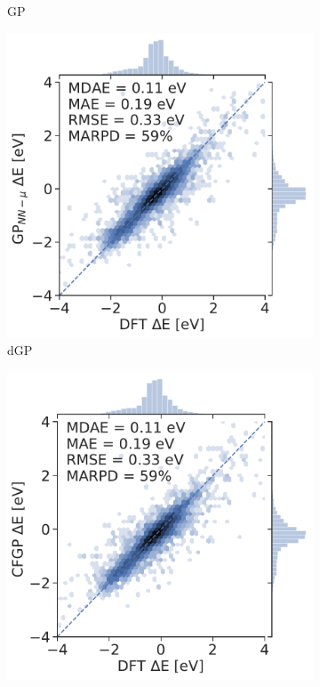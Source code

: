 \documentclass[]{achemso}
\begin{document}
\begin{figure}
\begin{subfigure}{0.32\textwidth}
        \caption{\gls{GP}}\label{fig:parity_gp}
    \end{subfigure}
    \begin{subfigure}{0.32\textwidth}
        \includegraphics[width=\textwidth]{../GPnnm/Matern/parity.pdf}
        \caption{\gls{dGP}}\label{fig:parity_dgp}
    \end{subfigure}
    \begin{subfigure}{0.32\textwidth}
        \includegraphics[width=\textwidth]{../CFGP/Matern/parity.pdf}

\end{subfigure}
\end{figure}
\end{document}
